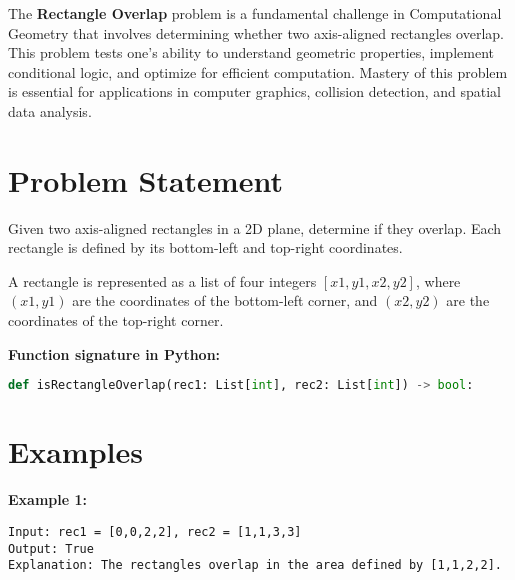 
\label{chap:Rectangle_Overlap}

The \textbf{Rectangle Overlap} problem is a fundamental challenge in Computational Geometry that involves determining whether two axis-aligned rectangles overlap. This problem tests one's ability to understand geometric properties, implement conditional logic, and optimize for efficient computation. Mastery of this problem is essential for applications in computer graphics, collision detection, and spatial data analysis.

\section*{Problem Statement}

Given two axis-aligned rectangles in a 2D plane, determine if they overlap. Each rectangle is defined by its bottom-left and top-right coordinates.

A rectangle is represented as a list of four integers \([x1, y1, x2, y2]\), where \((x1, y1)\) are the coordinates of the bottom-left corner, and \((x2, y2)\) are the coordinates of the top-right corner.

\textbf{Function signature in Python:}
\begin{lstlisting}[language=Python]
def isRectangleOverlap(rec1: List[int], rec2: List[int]) -> bool:
\end{lstlisting}

\section*{Examples}

\textbf{Example 1:}

\begin{verbatim}
Input: rec1 = [0,0,2,2], rec2 = [1,1,3,3]
Output: True
Explanation: The rectangles overlap in the area defined by [1,1,2,2].
\end{verbatim}

